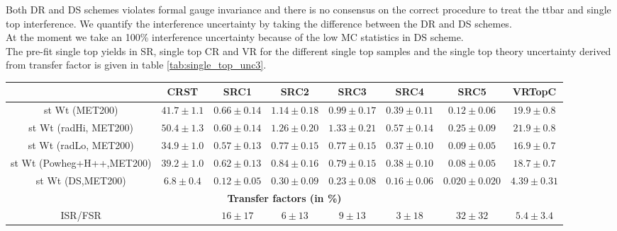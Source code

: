 \indent  Both DR and DS schemes violates formal gauge invariance and there is no consensus on the correct procedure to treat the ttbar and single top interference.  We quantify the interference uncertainty by taking the difference between the DR and DS schemes.  \\

\indent At the moment we take an 100\% interference uncertainty because of the low MC statistics in DS scheme. \\

\indent The pre-fit single top yields in SR, single top CR and VR for the different single top samples and the single top theory uncertainty derived from transfer factor is given in table \ref{tab:single_top_unc3}. \\

   \begin{table}[!h]
    \begin{center} \footnotesize
        \begin{tabular}{|c|c|c|c|c|c|c|c|}
        \hline
        & CRST  & SRC1 & SRC2 & SRC3 & SRC4 & SRC5 & VRTopC\\ \hline
          \hline
          st Wt (MET200)&          $41.7\pm 1.1$&          $0.66\pm 0.14$&         $1.14\pm 0.18$&         $0.99\pm 0.17$&         $0.39\pm 0.11$&         $0.12\pm 0.06$&         $19.9\pm 0.8$\\
          st Wt (radHi, MET200)&   $50.4\pm 1.3$&          $0.60\pm 0.14$&         $1.26\pm 0.20$&         $1.33\pm 0.21$&         $0.57\pm 0.14$&         $0.25\pm 0.09$&         $21.9\pm 0.8$\\
st Wt (radLo, MET200)&   $34.9\pm 1.0$&          $0.57\pm 0.13$&         $0.77\pm 0.15$&         $0.77\pm 0.15$&         $0.37\pm 0.10$&         $0.09\pm 0.05$&         $16.9\pm 0.7$\\
st Wt (Powheg+H++,MET200)&       $39.2\pm 1.0$&          $0.62\pm 0.13$&         $0.84\pm 0.16$&         $0.79\pm 0.15$&         $0.38\pm 0.10$&         $0.08\pm 0.05$&         $18.7\pm 0.7$\\
st Wt (DS,MET200)&       $6.8\pm 0.4$&   $0.12\pm 0.05$&         $0.30\pm 0.09$&         $0.23\pm 0.08$&         $0.16\pm 0.06$&         $0.020\pm 0.020$&       $4.39\pm 0.31$\\
          \hline \hline 
          \multicolumn{8}{c}{\bf Transfer factors (in \%)} \\ \hline
          ISR/FSR& &       $16\pm17$&      $6\pm13$&       $9\pm13$&       $3\pm18$&       $32\pm32$&      $5.4\pm3.4$\\

\end{tabular}
\end{center}
\end{table}

